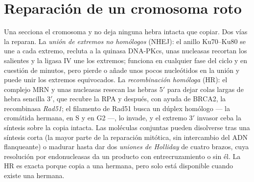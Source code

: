 \section{Reparación de un cromosoma roto}

\begin{definition}\label{def:b3:dna-repair:dsb}
Una \emph{} secciona el cromosoma y no deja ninguna
hebra intacta que copiar. Dos vías la reparan. La \emph{unión de extremos
no homólogos} (NHEJ): el anillo Ku70--Ku80 se une a cada extremo, recluta
a la quinasa DNA-PKcs, unas nucleasas recortan los salientes y la ligasa
IV une los extremos; funciona en cualquier fase del ciclo y en cuestión
de minutos, pero pierde o añade unos pocos nucleótidos en la unión y
puede unir los extremos equivocados. La \emph{recombinación homóloga}
(HR): el complejo MRN y unas nucleasas resecan las hebras 5$'$ para dejar
colas largas de hebra sencilla 3$'$, que recubre la RPA y después, con
ayuda de BRCA2, la recombinasa \emph{Rad51}; el filamento de Rad51 busca
un dúplex homólogo --- la cromátida hermana, en S y en G2 ---, lo invade,
y el extremo 3$'$ invasor ceba la síntesis sobre la copia intacta. Las
moléculas conjuntas pueden disolverse tras una síntesis corta (la mayor
parte de la reparación mitótica, sin intercambio del ADN flanqueante) o
madurar hasta dar dos \emph{uniones de Holliday} de cuatro brazos, cuya
resolución por endonucleasas da un producto con entrecruzamiento o sin
él. La HR es exacta porque copia a una hermana, pero solo está disponible
cuando existe una hermana.
\end{definition}

